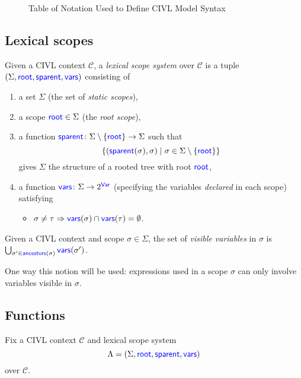 \documentclass[11pt]{article}
\begin{document}
\begin{figure}
  \notationtable
  \caption{Table of Notation Used to Define CIVL Model Syntax}
  \label{fig:notation}
\end{figure}

\subsection{Lexical scopes}
\label{sec:scopes}

\begin{definition}
  Given a CIVL context $\mathcal{C}$, a \emph{lexical scope system}
  over $\mathcal{C}$ is a tuple $(\Sigma,\textsf{\textcolor{blue}{\textup{root}}},\textsf{\textcolor{blue}{\textup{sparent}}},\textsf{\textcolor{blue}{\textup{vars}}})$
  consisting of
  \begin{enumerate}
  \item a set $\Sigma$ (the set of \emph{static scopes}),
  \item a scope $\textsf{\textcolor{blue}{\textup{root}}}\in\Sigma$ (the  \emph{root scope}),
  \item a function
    $\textsf{\textcolor{blue}{\textup{sparent}}}\colon\Sigma\setminus\{\textsf{\textcolor{blue}{\textup{root}}}\}\rightarrow
    \Sigma$ such that 
    \[\{(\textsf{\textcolor{blue}{\textup{sparent}}}(\sigma),\sigma)\mid \sigma\in\Sigma\setminus\{\textsf{\textcolor{blue}{\textup{root}}}\}\}\]
    gives $\Sigma$ the structure of a rooted tree with root $\textsf{\textcolor{blue}{\textup{root}}}$,
  \item a function $\textsf{\textcolor{blue}{\textup{vars}}}\colon\Sigma\rightarrow 2^{\textsf{\textcolor{blue}{\textup{Var}}}}$ 
    (specifying the variables \emph{declared} in each scope) satisfying
    \begin{itemize}
    \item $\sigma\neq\tau\Rightarrow \textsf{\textcolor{blue}{\textup{vars}}}(\sigma)\cap \textsf{\textcolor{blue}{\textup{vars}}}(\tau)=\emptyset$.
    \end{itemize}
  \end{enumerate}
\end{definition}

\begin{definition}
  Given a CIVL context and scope $\sigma\in\Sigma$,
  the set of \emph{visible variables} in $\sigma$
  is $\bigcup_{\sigma'\in\textsf{\textcolor{blue}{\textup{ancestors}}}(\sigma)}\textsf{\textcolor{blue}{\textup{vars}}}(\sigma')$.
\end{definition}

One way this notion will be used: expressions used in a scope $\sigma$
can only involve variables visible in $\sigma$.

\subsection{Functions}
\label{sec:functions}

Fix a CIVL context $\mathcal{C}$ and lexical scope system
\[\Lambda=(\Sigma,\textsf{\textcolor{blue}{\textup{root}}},\textsf{\textcolor{blue}{\textup{sparent}}},\textsf{\textcolor{blue}{\textup{vars}}})\] over $\mathcal{C}$.
\end{document}
